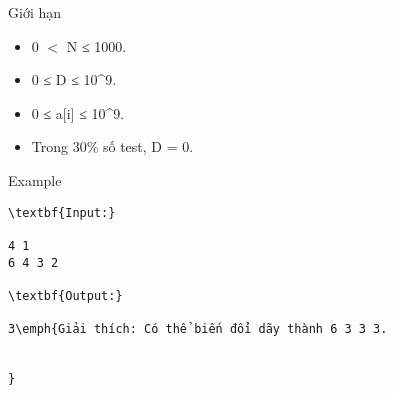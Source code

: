 Giới hạn
\begin{itemize}
	\item     0 $<$ N ≤ 1000.   
	\item     0 ≤ D ≤ 10^9.   
	\item     0 ≤ a[i] ≤ 10^9.   
	\item     Trong 30\% số test, D = 0.   
\end{itemize}
Example
\begin{verbatim}
\textbf{Input:}

4 1
6 4 3 2

\textbf{Output:}

3\emph{Giải thích: Có thể biến đổi dãy thành 6 3 3 3.


}


\end{verbatim}